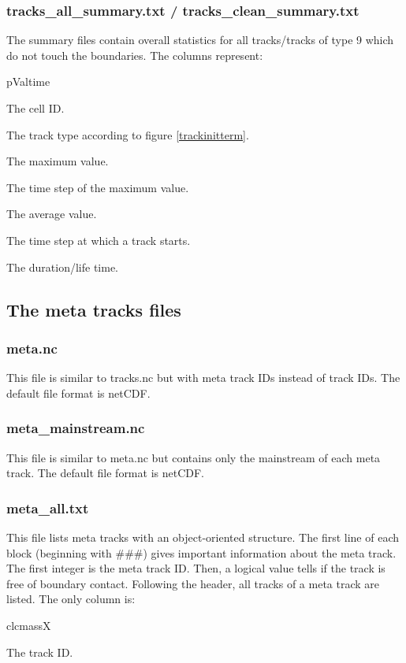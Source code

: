\documentclass{scrartcl}
\begin{document}
\subsubsection{tracks\_all\_summary.txt / tracks\_clean\_summary.txt}
The summary files contain overall statistics for all tracks/tracks of type 9 which do not touch the boundaries. The columns represent:
\begin{labeling}{pValtime}
	\item[trackID] The cell ID.
	\item[trType] The track type according to figure \ref{trackinitterm}.
	\item[peakVal] The maximum value.
	\item[pValtime] The time step of the maximum value.
	\item[avVal] The average value.	
	\item[start] The time step at which a track starts.
	\item[dur] The duration/life time.
\end{labeling}

\subsection{The meta tracks files}
\subsubsection{meta.nc}
This file is similar to tracks.nc but with meta track IDs instead of track IDs. The default file format is netCDF.

\subsubsection{meta\_mainstream.nc}
This file is similar to meta.nc but contains only the mainstream of each meta track. The default file format is netCDF.

\subsubsection{meta\_all.txt}
This file lists meta tracks with an object-oriented structure. The first line of each block (beginning with \#\#\#) gives important information about the meta track. The first integer is the meta track ID. Then, a logical value tells if the track is free of boundary contact. Following the header, all tracks of a meta track are listed. The only column is:
\begin{labeling}{clcmassX}
	\item[trackID] The track ID.
\end{labeling}
\end{document}
